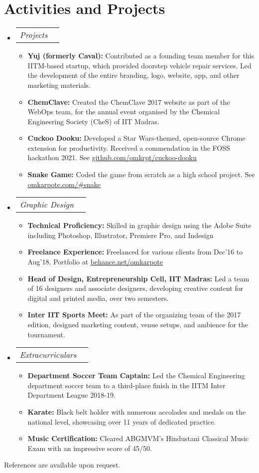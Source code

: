 \documentclass[letterpaper,11pt]{article}
\makeatletter
\newcommand{\resumeItem}[1]{
  \item\small{
    {#1 \vspace{-2pt}}
  }
}
\newcommand{\resumeSubSubheading}[2]{
    \item
    \begin{tabular*}{1.0\textwidth}{l@{\extracolsep{\fill}}r}
      \textit{\small#1} & \textit{\small #2} \\
    \end{tabular*}\vspace{-7pt}
}
\newcommand{\resumeSubHeadingListStart}{\begin{itemize}[leftmargin=0.0in, label={}]}
\newcommand{\resumeSubHeadingListEnd}{\end{itemize}}
\newcommand{\resumeItemListStart}{\begin{itemize}}
\newcommand{\resumeItemListEnd}{\end{itemize}\vspace{-5pt}}
\makeatother
\begin{document}
\section{Activities and Projects}
    \resumeSubHeadingListStart
        \resumeSubSubheading
            {Projects}{}
            \resumeItemListStart
                \resumeItem{\textbf{Yuj (formerly Caval):} Contributed as a founding team member for this IITM-based startup, which provided doorstep vehicle repair services. Led the development of the entire branding, logo, website, app, and other marketing materials.}
                \resumeItem{\textbf{ChemClave:} Created the ChemClave 2017 website as part of the WebOps team, for the annual event organised by the Chemical Engineering Society (CheS) of IIT Madras.}
                \resumeItem{\textbf{Cuckoo Dooku:} Developed a Star Wars-themed, open-source Chrome extension for productivity. Received a commendation in the FOSS hackathon 2021. See \href{https://github.com/omkrpt/cuckoo-dooku}{\underline{github.com/omkrpt/cuckoo-dooku}}}
                \resumeItem{\textbf{Snake Game:} Coded the game from scratch as a high school project. See
                \href{https://omkarpote.com/\#snake}{\underline{omkarpote.com/\#snake}}}
            \resumeItemListEnd
        \resumeSubSubheading
            {Graphic Design}{}
            \resumeItemListStart
                \resumeItem{\textbf{Technical Proficiency:} Skilled in graphic design using the Adobe Suite including Photoshop, Illustrator, Premiere Pro, and Indesign}
                \resumeItem{\textbf{Freelance Experience:} Freelanced for various clients from Dec'16 to Aug'18. Portfolio at 
                \href{https://www.behance.net/omkarpote}{\underline{behance.net/omkarpote}}}
                \resumeItem{\textbf{Head of Design, Entrepreneurship Cell, IIT Madras:} Led a team of 16 designers and associate designers, developing creative content for digital and printed media, over two semesters.}
                \resumeItem{\textbf{Inter IIT Sports Meet:} As part of the organizing team of the 2017 edition, designed marketing content, venue setups, and ambience for the tournament.}
            \resumeItemListEnd
        \resumeSubSubheading
            {Extracurriculars}{}
            \resumeItemListStart
                \resumeItem{\textbf{Department Soccer Team Captain:} Led the Chemical Engineering department soccer team to a third-place finish in the IITM Inter Department League 2018-19.}
                \resumeItem{\textbf{Karate:} Black belt holder with numerous accolades and medals on the national level, showcasing over 11 years of dedicated practice.}
                \resumeItem{\textbf{Music Certification:} Cleared ABGMVM's Hindustani Classical Music Exam with an impressive score of 45/50.}
            \resumeItemListEnd
        
    \resumeSubHeadingListEnd

References are available upon request.
    
\end{document}
